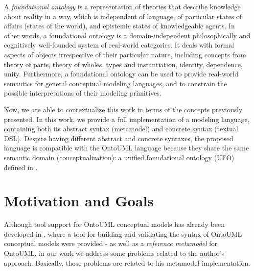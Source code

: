 \documentclass[
	10pt,				%
	oneside,
	a4paper,			%
	brazil,
	english
	]{abntex2}
\begin{document}
A \emph{foundational ontology} is a representation of theories that describe
knowledge about reality in a way, which is independent of language, of particular
states of affairs (states of the world), and epistemic states of knowledgeable agents.
In other words, a foundational ontology is a domain-independent philosophically
and cognitively well-founded system of real-world categories. It deals with formal
aspects of objects irrespective of their particular nature, including concepts
from theory of parts, theory of wholes, types and instantiation, identity,
dependence, unity. Furthermore, a foundational ontology can be used to provide
real-world semantics for general conceptual modeling languages, and to constrain
the possible interpretations of their modeling primitives. \cite{carraretto10}

Now, we are able to contextualize this work in terms of the concepts previously
presented.
%
%
In this work, we provide a full implementation of a modeling language, containing
both its abstract syntax (metamodel) and concrete syntax (textual DSL).
Despite having different abstract and concrete syntaxes, the proposed language is
compatible with the OntoUML language because they share the same semantic domain
(conceptualization): a unified foundational ontology (UFO) defined in \cite{guizzardi05}.

\section{Motivation and Goals}

Although tool support for OntoUML conceptual models has already been developed
in \cite{carraretto10}, where a tool for building and validating the syntax
of OntoUML conceptual models were provided - as well as a \emph{reference metamodel}
for OntoUML, in our work we address some problems related to the author’s approach.
%
Basically, those problems are related to his metamodel implementation.
\end{document}
